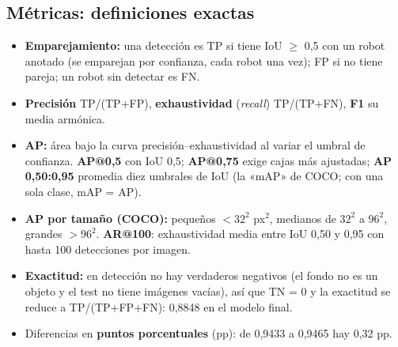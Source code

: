 \documentclass[11pt,a4paper]{article}
\begin{document}
\subsection{Métricas: definiciones exactas}
\begin{itemize}
  \item \textbf{Emparejamiento:} una detección es TP si tiene IoU $\ge$ 0,5 con un robot anotado (se emparejan por confianza, cada robot una vez); FP si no tiene pareja; un robot sin detectar es FN.
  \item \textbf{Precisión} TP/(TP+FP), \textbf{exhaustividad} (\emph{recall}) TP/(TP+FN), \textbf{F1} su media armónica.
  \item \textbf{AP:} área bajo la curva precisión--exhaustividad al variar el umbral de confianza. \textbf{AP@0,5} con IoU 0,5; \textbf{AP@0,75} exige cajas más ajustadas; \textbf{AP 0,50:0,95} promedia diez umbrales de IoU (la «mAP» de COCO; con una sola clase, mAP = AP).
  \item \textbf{AP por tamaño (COCO):} pequeños $<32^2$ px$^2$, medianos de $32^2$ a $96^2$, grandes $>96^2$. \textbf{AR@100}: exhaustividad media entre IoU 0,50 y 0,95 con hasta 100 detecciones por imagen.
  \item \textbf{Exactitud:} en detección no hay verdaderos negativos (el fondo no es un objeto y el test no tiene imágenes vacías), así que TN = 0 y la exactitud se reduce a TP/(TP+FP+FN): 0,8848 en el modelo final.
  \item Diferencias en \textbf{puntos porcentuales} (pp): de 0,9433 a 0,9465 hay 0,32 pp.
\end{itemize}
\end{document}

